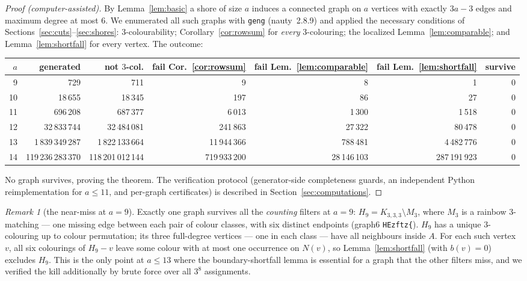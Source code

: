 \documentclass[11pt]{article}
\theoremstyle{remark}
\newtheorem{remark}[theorem]{Remark}
\begin{document}
\begin{proof}[Proof (computer-assisted)]
By Lemma~\ref{lem:basic} a shore of size $a$ induces a connected graph on $a$
vertices with exactly $3a-3$ edges and maximum degree at most $6$. We enumerated
all such graphs with \texttt{geng} (nauty~2.8.9) and applied the necessary
conditions of Sections~\ref{sec:cuts}--\ref{sec:shores}: $3$-colourability;
Corollary~\ref{cor:rowsum} for \emph{every} $3$-colouring; the localized
Lemma~\ref{lem:comparable}; and Lemma~\ref{lem:shortfall} for every vertex. The
outcome:

\begin{center}
\begin{tabular}{rrrrrrr}
\toprule
$a$ & generated & not $3$-col. & fail Cor.~\ref{cor:rowsum} & fail
Lem.~\ref{lem:comparable} & fail Lem.~\ref{lem:shortfall} & survive\\
\midrule
9  & 729           & 711           & 9          & 8       & 1         & 0\\
10 & 18\,655        & 18\,345        & 197        & 86      & 27        & 0\\
11 & 696\,208       & 687\,377       & 6\,013      & 1\,300   & 1\,518     & 0\\
12 & 32\,833\,744    & 32\,484\,081    & 241\,863    & 27\,322  & 80\,478    & 0\\
13 & 1\,839\,349\,287 & 1\,822\,133\,664 & 11\,944\,366 & 788\,481 & 4\,482\,776 & 0\\
14 & 119\,236\,283\,370 & 118\,201\,012\,144 & 719\,933\,200 & 28\,146\,103 & 287\,191\,923 & 0\\
\bottomrule
\end{tabular}
\end{center}

No graph survives, proving the theorem. The verification protocol (generator-side
completeness guards, an independent Python reimplementation for $a\le 11$, and
per-graph certificates) is described in Section~\ref{sec:computations}.
\end{proof}

\begin{remark}[the near-miss at $a=9$]
Exactly one graph survives all the \emph{counting} filters at $a=9$:
$H_9=K_{3,3,3}\setminus M_3$, where $M_3$ is a rainbow $3$-matching --- one
missing edge between each pair of colour classes, with six distinct endpoints
(graph6 \texttt{HEzftz\{}). $H_9$ has a unique $3$-colouring up to
colour permutation; its three full-degree vertices --- one in each class --- have
all neighbours inside $A$. For each such vertex $v$, all six colourings of
$H_9-v$ leave some colour with at most one occurrence on $N(v)$, so
Lemma~\ref{lem:shortfall} (with $b(v)=0$) excludes $H_9$. This is the only point
at $a\le 13$ where the boundary-shortfall lemma is essential for a graph that the
other filters miss, and we verified the kill additionally by brute force over all
$3^{8}$ assignments.
\end{remark}
\end{document}
